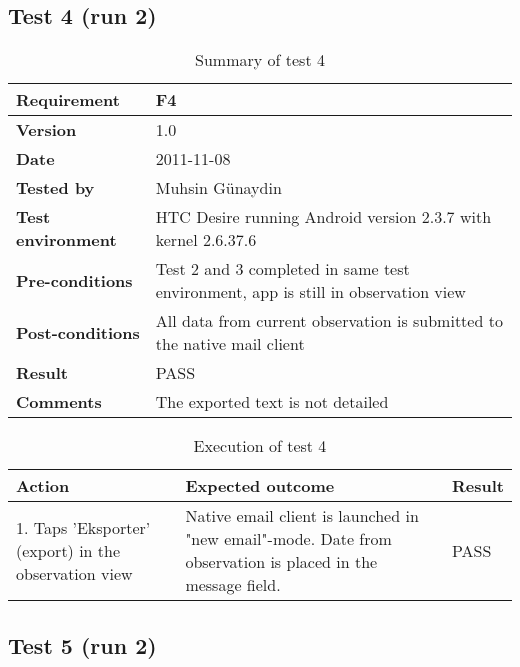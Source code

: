 \newpage
\subsection*{Test 4 (run 2)}

	\begin{table}[htb]
		\centering
		\begin{tabular}{|p{3.5cm}|p{7.0cm}|} \hline
			\textbf{Requirement} & F4 \\ \hline
			\textbf{Version} & 1.0 \\ \hline
			\textbf{Date} & 2011-11-08 \\ \hline
			\textbf{Tested by} & Muhsin Günaydin \\ \hline
			\textbf{Test environment} & HTC Desire running Android version 2.3.7 with kernel 2.6.37.6 \\ \hline
			\textbf{Pre-conditions} & Test 2 and 3 completed in same test environment, app is still in observation view \\ \hline
			\textbf{Post-conditions} & All data from current observation is submitted to the native mail client \\ \hline
			\textbf{Result} & PASS \\ \hline
			\textbf{Comments} & The exported text is not detailed  \\ \hline
		\end{tabular}
		\caption{Summary of test 4}
	\end{table}

	\begin{table}[htb]
		\centering
		\begin{tabular}{|p{5.0cm}|p{5.0cm}|p{1cm}|}
			\hline \textbf{Action} & \textbf{Expected outcome} & \textbf{Result} \\ \hline
			1. Taps 'Eksporter' (export) in the observation view &
			Native email client is launched in "new email"-mode. Date from
			observation is placed in the message field. &
			PASS \\ \hline
		\end{tabular}
		\caption{Execution of test 4}
	\end{table}

\newpage
\subsection*{Test 5 (run 2)}

